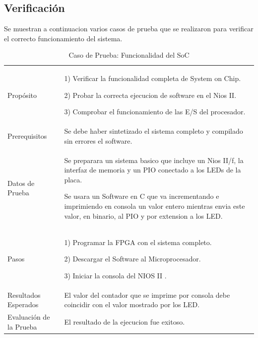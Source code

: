 \subsection{Verificación}
Se muestran a continuacion varios casos de prueba que se realizaron para verificar el correcto funcionamiento del sistema.
\begin{table}
	\begin{tabular}{|>{\columncolor[gray]{0.8}}l|p{9cm}|} \hline
\multicolumn{2}{|>{\columncolor[gray]{0.8}}l|}{\textbf{Caso de Prueba: Funcionalidad del SoC}}\\ \hline
Propósito  & 1) Verificar la funcionalidad completa de System on Chip. 

2) Probar la correcta ejecucion de software en el Nios II.

3) Comprobar el funcionamiento de las E/S del procesador. 
\\ \hline
 Prerequisitos  & Se debe haber sintetizado el sistema completo y compilado sin errores el software.\\ \hline
 Datos de Prueba & Se preparara un sistema basico que incluye un Nios II/f, la interfaz de memoria y un PIO conectado a los LEDs de la placa.

Se usara un Software en C que va incrementando e imprimiendo en consola un valor entero mientras envia este valor, en binario, al PIO y por extension a los LED.  \\ \hline
 Pasos & 1) Programar la FPGA con el sistema completo.

2) Descargar el Software al Microprocesador.

3) Iniciar la consola del NIOS II .\\ \hline
 Resultados Esperados & El valor del contador que se imprime por consola debe coincidir con el valor mostrado por los LED.\\ \hline
 Evaluación de la Prueba  & El resultado de la ejecucion fue exitoso. \\ \hline
	\end{tabular}
	\caption{Caso de Prueba: Funcionalidad del SoC}
	\label{tab:testsoc}
\end{table}
